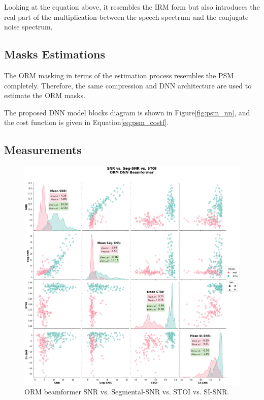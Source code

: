Looking at the equation above, 
it resembles the IRM form but also introduces
the real part of the multiplication between the speech spectrum
and the conjugate noise spectrum.

\subsection{Masks Estimations}
The ORM masking in terms of the estimation process resembles the
PSM completely. Therefore, the same compression and 
DNN architecture are used to estimate the ORM masks.

The proposed DNN model blocks diagram is shown in Figure\;\ref{fig:psm_nn},
and the cost function is given in Equation\;\ref{eq:psm_costf}.

\subsection{Measurements}

\begin{figure}[H]
    \centering
    \includegraphics[width=\linewidth]{Features/images/orm_snr_stoi}
    \caption{ORM beamformer SNR vs. Segmental-SNR vs. STOI vs. SI-SNR.}\label{fig:orm_snr_stoi}
\end{figure}

